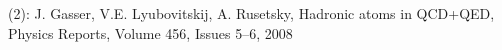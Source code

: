 \documentclass[preview]{standalone}
\begin{document}
\begin{center}
(2): J. Gasser, V.E. Lyubovitskij, A. Rusetsky, Hadronic atoms in QCD+QED, Physics Reports, Volume 456, Issues 5–6, 2008
\end{center}
\end{document}
